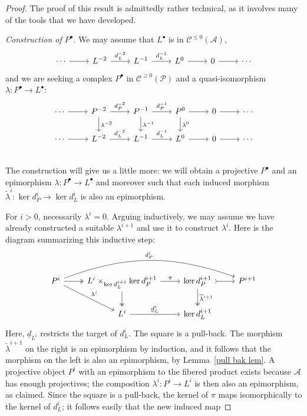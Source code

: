 \begin{proof}
The proof of this result is admittedly rather technical, as it involves many of the tools that we have developed.\par
\textit{Construction of $P^\bullet$}. We may assume that $L^\bullet$ is in $\mathcal{C}^{\leq0}(\mathcal{A})$,
\[\begin{tikzcd}
\cdots\ar[r]&L^{-2}\ar[r,"d_L^{-2}"]&L^{-1}\ar[r,"d_L^{-1}"]&L^0\ar[r]&0\ar[r]&\cdots
\end{tikzcd}\]
and we are seeking a complex $P^\bullet$ in $\mathcal{C}^{\geq0}(\mathcal{P})$ and a quasi-isomorphism $\lambda:P^\bullet\to L^\bullet$:
\[\begin{tikzcd}
\cdots\ar[r]&P^{-2}\ar[d,"\lambda^{-2}"]\ar[r,"d_P^{-2}"]&P^{-1}\ar[d,"\lambda^{-1}"]\ar[r,"d_P^{-1}"]&P^0\ar[r]\ar[d,"\lambda^{0}"]&0\ar[r]&\cdots\\
\cdots\ar[r]&L^{-2}\ar[r,"d_L^{-2}"]&L^{-1}\ar[r,"d_L^{-1}"]&L^0\ar[r]&0\ar[r]&\cdots\\
\end{tikzcd}\]
The construction will give us a little more: we will obtain a projective $P^\bullet$ and an epimorphism $\lambda:P^\bullet\to L^\bullet$ and moreover such that each 
induced morphism $\widetilde{\lambda}^i:\ker d^i_P\to\ker d^i_L$ is also an epimorphism.\par
For $i>0$, necessarily $\lambda^i=0$. Arguing inductively, we may assume we have already constructed a suitable $\lambda^{i+1}$ and use it to construct $\lambda^i$. Here is the diagram summarizing this inductive step:
\[\begin{tikzcd}
P^i\ar[rrr,bend left=20,"d_P^i"]\ar[rd,"\lambda^i"]\ar[r,two heads]&L^i\times_{\ker d_L^{i+1}}\ker d_P^{i+1}\ar[d,two heads]\ar[r,"\pi"]&\ker d_P^{i+1}\ar[d,two heads,"\widetilde{\lambda}^{i+1}"]\ar[r,tail]&P^{i+1}\\
&L^i\ar[r,"\underline{d}_{L}^i"]&\ker d_L^{i+1}&
\end{tikzcd}\]
Here, $\underline{d}_{L^i}$ restricts the target of $d^i_L$. The square is a pull-back. The morphism $\widetilde{\lambda}^{i+1}$ on the right is an epimorphism by 
induction, and it follows that the morphism on the left is also an epimorphism, by Lemma~\ref{pull bak lem}. A projective object $P^i$ with an epimorphism to the 
fibered product exists because $\mathcal{A}$ has enough projectives; the composition $\lambda^i:P^i\to L^i$ is then also an epimorphism, as claimed. Since the square 
is a pull-back, the kernel of $\pi$ maps isomorphically to the kernel of $d^i_L$; it follows easily that the new induced map 

\end{proof}

